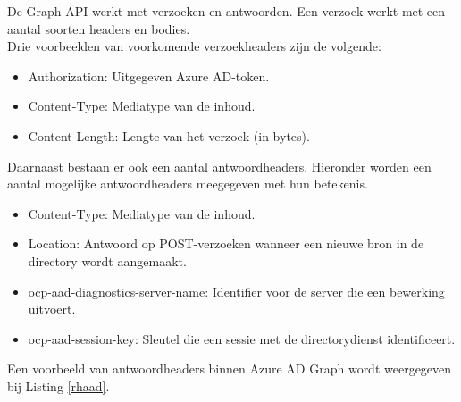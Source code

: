 
De Graph \ac{API} werkt met verzoeken en antwoorden. Een verzoek werkt met een aantal soorten headers en bodies. \\

Drie voorbeelden van voorkomende verzoekheaders zijn de volgende:

\begin{itemize}
    \item Authorization: Uitgegeven Azure \ac{AD}-token.
    \item Content-Type: Mediatype van de inhoud.
    \item Content-Length: Lengte van het verzoek (in bytes).
\end{itemize} 

Daarnaast bestaan er ook een aantal antwoordheaders. Hieronder worden een aantal mogelijke antwoordheaders meegegeven met hun betekenis.

\begin{itemize}
    \item Content-Type: Mediatype van de inhoud.
    \item Location: Antwoord op POST-verzoeken wanneer een nieuwe bron in de directory wordt aangemaakt.
    \item ocp-aad-diagnostics-server-name: Identifier voor de server die een bewerking uitvoert.
    \item ocp-aad-session-key: Sleutel die een sessie met de directorydienst identificeert.
\end{itemize}

Een voorbeeld van antwoordheaders binnen Azure \ac{AD} Graph wordt weergegeven bij Listing \ref{rhaad}. \\


